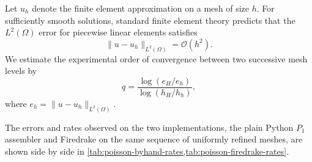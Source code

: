 \documentclass[a4paper,11pt]{article}
\newcommand{\Om}{\Omega}
\newcommand{\Lp}[1]{L^{2}(#1)}              %
\theoremstyle{spacedplain} \newtheorem{theorem}[counter]{Theorem} \newtheorem{lemma}[counter]{Lemma} \newtheorem{prop}[counter]{Proposition} \newtheorem{cor}[counter]{Corollary}
\theoremstyle{spaceddefinition} \newtheorem{defn}[counter]{Definition} \newtheorem{example}[counter]{Example} \newtheorem{remark}[counter]{Remark}
\begin{document}
Let $u_h$ denote the finite element approximation on a mesh of size $h$. For sufficiently smooth solutions, standard finite element theory predicts that the $\Lp{\Om}$ error for piecewise linear elements satisfies
\begin{equation}
  \|u - u_h\|_{\Lp{\Om}} = \mathcal{O}(h^{2}).
\end{equation}
We estimate the experimental order of convergence between two successive mesh levels by
\begin{equation}
  q = \frac{\log(e_H / e_h)}{\log(h_H / h_h)},
\end{equation}
where $e_h = \|u - u_h\|_{\Lp{\Om}}$.

The errors and rates observed on the two implementations, the plain Python $P_1$ assembler and Firedrake on the same sequence of uniformly refined meshes, are shown side by side in \cref{tab:poisson-byhand-rates,tab:poisson-firedrake-rates}.
\end{document}
